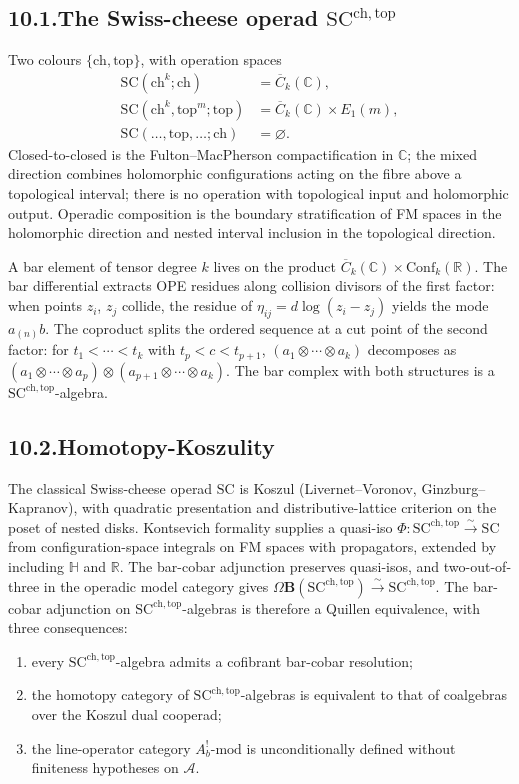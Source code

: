 \documentclass[11pt]{report}
\theoremstyle{definition}
\theoremstyle{remark}
\providecommand{\cA}{\mathcal{A}}
\providecommand{\FM}{\overline{C}}
\providecommand{\SC}{\mathrm{SC}}
\providecommand{\SCchtop}{\mathrm{SC}^{\mathrm{ch,top}}}
\providecommand{\bC}{\mathbb{C}}
\providecommand{\bR}{\mathbb{R}}
\providecommand{\Conf}{\mathrm{Conf}}
\numberwithin{equation}{section}
\begin{document}
\subsection*{10.1.\enspace The Swiss-cheese operad
$\SCchtop$}

Two colours $\{\mathrm{ch}, \mathrm{top}\}$, with operation
spaces
\begin{align*}
\SC(\mathrm{ch}^k; \mathrm{ch}) &= \FM_k(\bC),\\
\SC(\mathrm{ch}^k, \mathrm{top}^m; \mathrm{top})
&= \FM_k(\bC) \times E_1(m),\\
\SC(\ldots, \mathrm{top}, \ldots; \mathrm{ch}) &= \varnothing.
\end{align*}
Closed-to-closed is the Fulton--MacPherson compactification in
$\bC$; the mixed direction combines holomorphic configurations
acting on the fibre above a topological interval; there is no operation
with topological input and holomorphic output. Operadic composition is the boundary stratification
of FM spaces in the holomorphic direction and nested interval
inclusion in the topological direction.

A bar element of tensor degree $k$ lives on the product
$\FM_k(\bC) \times \Conf_k(\bR)$. The bar differential extracts
OPE residues along collision divisors of the first factor: when
points $z_i$, $z_j$ collide, the residue of
$\eta_{ij} = d\log(z_i - z_j)$ yields the mode $a_{(n)}b$. The
coproduct splits the ordered sequence at a cut point of the
second factor: for $t_1 < \cdots < t_k$ with $t_p < c < t_{p+1}$,
$(a_1\otimes\cdots\otimes a_k)$ decomposes as
$(a_1\otimes\cdots\otimes a_p)\otimes(a_{p+1}\otimes\cdots\otimes a_k)$.
The bar complex with both structures is a
$\SCchtop$-algebra.

\subsection*{10.2.\enspace Homotopy-Koszulity}

The classical Swiss-cheese operad $\SC$ is Koszul
(Livernet--Voronov, Ginzburg--Kapranov), with quadratic
presentation and distributive-lattice criterion on the poset
of nested disks. Kontsevich formality supplies a quasi-iso
$\Phi\colon \SCchtop \xrightarrow{\sim} \SC$ from
configuration-space integrals on FM spaces with propagators,
extended by including $\mathbb H$ and $\bR$. The bar-cobar
adjunction preserves quasi-isos, and two-out-of-three in the
operadic model category gives
$\Omega\mathbf B(\SCchtop) \xrightarrow{\sim} \SCchtop$. The
bar-cobar adjunction on $\SCchtop$-algebras is therefore a
Quillen equivalence, with three consequences:
\begin{enumerate}[label=(\roman*),nosep]
\item every $\SCchtop$-algebra admits a cofibrant bar-cobar
resolution;
\item the homotopy category of $\SCchtop$-algebras is
equivalent to that of coalgebras over the Koszul dual
cooperad;
\item the line-operator category $A_b^!\text{-mod}$ is
unconditionally defined without finiteness hypotheses on $\cA$.
\end{enumerate}
\end{document}
